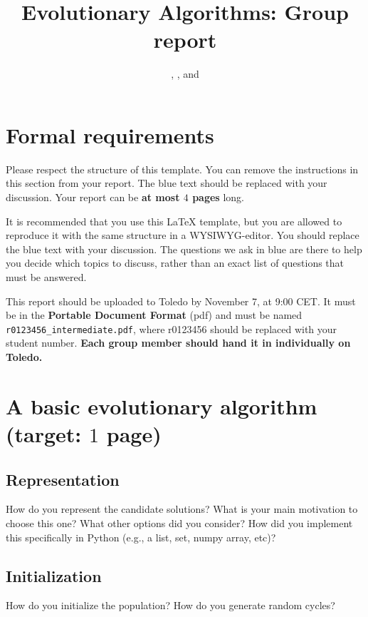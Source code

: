 \documentclass[a4paper,10pt]{article}
\title{\vspace{-2cm}Evolutionary Algorithms: Group report}
\author{\ReplaceMe{Group Member 1}, \ReplaceMe{Group Member 2}, and \ReplaceMe{Group Member 3}}
\newcommand{\thisyear}{\the\year}
\newcommand{\deadlineGroup}{November 7, \thisyear{} at 9:00 CET}
\newcommand{\ReplaceMe}[1]{{\color{blue}#1}}
\newcommand{\RemoveMe}[1]{{\color{purple}#1}}
\begin{document}
\selectfont{}

\maketitle

\RemoveMe{
\section*{Formal requirements}

Please respect the structure of this template. You can remove the instructions in this section from your report. The blue text should be replaced with your discussion. Your report can be \textbf{at most $4$ pages} long. 

It is recommended that you use this \LaTeX{} template, but you are allowed to reproduce it with the same structure in a WYSIWYG-editor. You should replace the blue text with your discussion. The questions we ask in blue are there to help you decide which topics to discuss, rather than an exact list of questions that must be answered.

This report should be uploaded to Toledo by \deadlineGroup. It must be in the \textbf{Portable Document Format} (pdf) and must be named \texttt{r0123456\_intermediate.pdf}, where r0123456 should be replaced with your student number. \textbf{Each group member should hand it in individually on Toledo.}
}

\section{A basic evolutionary algorithm \hfill(target: $1$ page)} 

\subsection{Representation}

\ReplaceMe{How do you represent the candidate solutions? What is your main motivation to choose this one? What other options did you consider? How did you implement this specifically in Python (e.g., a list, set, numpy array, etc)?}

\subsection{Initialization}

\ReplaceMe{How do you initialize the population? How do you generate random cycles?}
\end{document}
